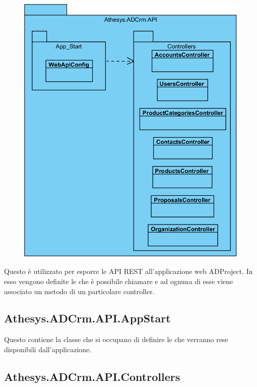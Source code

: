 \begin{figure}[H]
	\centering
	\includegraphics[width=\linewidth]{images/modules/API}
	\caption{}
	\label{fig:api}
\end{figure}

Questo  è utilizzato per esporre le API REST all'applicazione web ADProject. In esso vengono definite le  che è possibile chiamare e ad ognuna di esse viene associato un metodo di un particolare controller. 

\subsection{Athesys.ADCrm.API.AppStart}
Questo  contiene la classe che si occupano di definire le  che verranno rese disponibili dall'applicazione.

\subsection{Athesys.ADCrm.API.Controllers}

